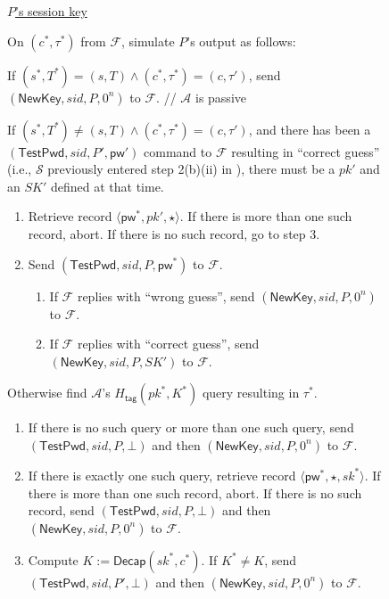 \documentclass{article}
\theoremstyle{plain}
\theoremstyle{definition}
\theoremstyle{remark}
\newcommand{\adv}{\mathcal{A}}
\renewcommand{\sim}{\mathcal{S}}
\newcommand{\func}{\mathcal{F}}
\newcommand{\Decap}{\mathsf{Decap}}
\newcommand{\Htag}{H_\mathsf{tag}}
\newcommand{\pw}{\mathsf{pw}}
\newcommand{\TestPwd}{\mathsf{TestPwd}}
\newcommand{\NewKey}{\mathsf{NewKey}}
\begin{document}
\begin{figure}[H]
\begin{framed}
\begin{small}
\underline{$P$'s session key}

\medskip
On $(c^*,\tau^*)$ from $\func$, simulate $P$'s output as follows:
\begin{enumerate}
  \item If $(s^*,T^*) = (s,T) \land (c^*,\tau^*) = (c,\tau')$, send $(\NewKey, sid, P, 0^n)$ to $\func$. \textcolor[gray]{0.5}{// $\adv$ is passive}
  {\color{blue}\item If $(s^*,T^*) \neq (s,T) \land (c^*,\tau^*) = (c,\tau')$, and there has been a $(\TestPwd, sid, P', \pw')$ command to $\func$ resulting in ``correct guess'' (i.e., $\sim$ previously entered step 2(b)(ii) in ), there must be a $pk'$ and an $SK'$ defined at that time. 
      \begin{enumerate}
        \item Retrieve record $\langle\pw^*,pk',\star\rangle$. If there is more than one such record, abort. If there is no such record, go to step 3.
        \item Send $(\TestPwd, sid, P, \pw^*)$ to $\func$.
            \begin{enumerate}
              \item If $\func$ replies with ``wrong guess'', send $(\NewKey, sid, P, 0^n)$ to $\func$.
              \item If $\func$ replies with ``correct guess'', send $(\NewKey, sid, P, SK')$ to $\func$.
            \end{enumerate}
      \end{enumerate}
  }
  \item Otherwise find $\adv$'s {\color{blue}$\Htag(pk^*,K^*)$} query resulting in $\tau^*$.
      \begin{enumerate}
        \item If there is no such query or more than one such query, send $(\TestPwd, sid, P, \bot)$ and then $(\NewKey, sid, P, 0^n)$ to $\func$.
        \item If there is exactly one such query, retrieve record $\langle\pw^*,\star,sk^*\rangle$. If there is more than one such record, abort. If there is no such record, send $(\TestPwd, sid, P, \bot)$ and then $(\NewKey, sid, P, 0^n)$ to $\func$.
        \item Compute $K := \Decap(sk^*,c^*)$. If $K^* \neq K$, send $(\TestPwd, sid, P', \bot)$ and then $(\NewKey, sid, P, 0^n)$ to $\func$.

\end{enumerate}
\end{enumerate}
\end{small}
\end{framed}
\end{figure}
\end{document}

